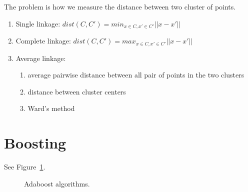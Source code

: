  The problem is how we measure the distance
between two cluster of points.
\begin{enumerate}
	\item Single linkage: $dist(C, C') = min_{x \in C, x' \in C'} ||x - x'||$
	\item Complete linkage: $dist(C, C') = max_{x \in C, x' \in C'} ||x - x'||$
	\item Average linkage:
		\begin{enumerate}
			\item average pairwise distance between all pair of points in the two clusters
			\item distance between cluster centers
			\item Ward's method
		\end{enumerate}
\end{enumerate}


\section{Boosting}
 See Figure~\ref{fig:adaboost_mar}.
\begin{figure}[H]
	\caption{Adaboost algorithms.}
	\label{fig:adaboost_mar}
\end{figure}

